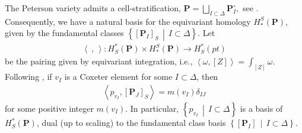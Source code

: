 \documentclass[10pt]{article}
\numberwithin{thm}{section}
\theoremstyle{definition}
\theoremstyle{remark}
\newcommand{\Pet}{\ensuremath{\mathbf{P}}}
\newcommand{\set}[2]{\left\{#1\,\middle\vert\,#2\right\}}
\begin{document}
The Peterson variety admits a cell-stratification,
$
\Pet=\bigsqcup_{I\subset\Delta}\Pet_I^\circ,
$
see \cite{tymoczko:paving,precup,balibanu:peterson}.
Consequently, we have a natural basis for the equivariant homology $H_*^S(\Pet)$,
given by the fundamental classes $\set{[\Pet_I]_S}{I\subset\Delta}$.
Let 
\begin{align*}
\left\langle\ ,\,\right\rangle:H^*_S(\Pet)\times H_*^S(\Pet)\to H^*_S(pt)
\end{align*}
 be the pairing given by equivariant integration,
i.e., $\left\langle\omega,[Z]\right\rangle=\int_{[Z]}\omega$. 
Following \cite[Thm 1.1]{gms:peterson},
if $v_I$ is a Coxeter element for some $I\subset\Delta$,
then
\begin{align}
\label{intro:dual}
\left\langle p_{v_I},[\Pet_J]_S\right\rangle=m(v_I)\delta_{IJ}
\end{align}
for some positive integer $m(v_I)$.
In particular, $\set{p_{v_I}}{I\subset\Delta}$ is a basis of $H_S^*(\Pet)$,
dual (up to scaling) to the fundamental class basis $\set{[\Pet_I]}{I\subset\Delta}$.
\end{document}
